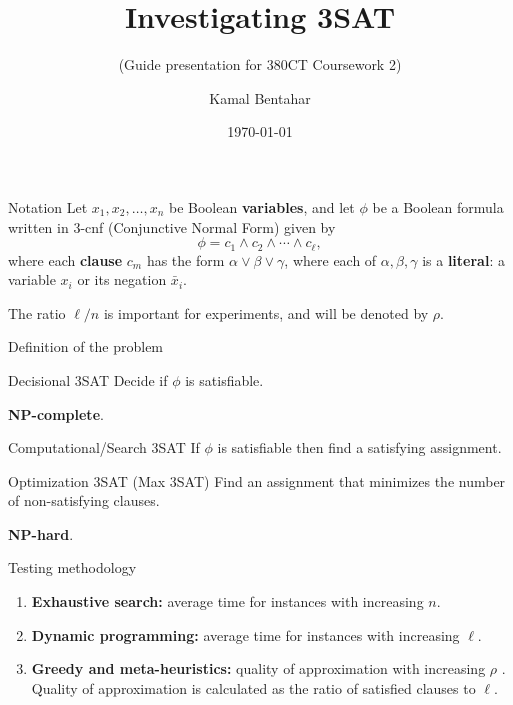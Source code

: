\documentclass[aspectratio=169, compress, xcolor=table,xcolor=dvipsnames]{beamer}
\author{Kamal Bentahar}
\title{Investigating 3SAT}
\subtitle{(Guide presentation for 380CT Coursework 2)}
\date{\today}
\newcommand{\cnpc}{\textbf{NP-complete}}
\newcommand{\cnph}{\textbf{NP-hard}}
\renewcommand{\lnot}{\bar}
\begin{document}
\begin{frame}[noframenumbering]
	\titlepage
\end{frame}
	
\begin{frame}{Notation}
	Let $x_1,x_2,\ldots,x_n$ be Boolean \textbf{variables}, and let $\phi$ be a Boolean formula written in 3-cnf (Conjunctive Normal Form) given by
	\[
	\phi = c_1\land c_2\land \cdots \land c_\ell,
	\]
where each \textbf{clause} $c_m$ has the form $\alpha\lor \beta \lor \gamma$, where each of $\alpha, \beta, \gamma$ is a \textbf{literal}: a variable $x_i$ or its negation $\lnot x_i$.

\vfill
The ratio $\ell/n$ is important for experiments, and will be denoted by $\rho$.
\end{frame}

\begin{frame}{Definition of the problem}


	\begin{block}{Decisional 3SAT}
		Decide if $\phi$ is satisfiable.
	\end{block}
	\cnpc.

	\begin{block}{Computational/Search 3SAT}
		If $\phi$ is satisfiable then find a satisfying assignment.
	\end{block}

	\begin{block}{Optimization 3SAT (Max 3SAT)}
		Find an assignment that minimizes the number of non-satisfying clauses.
	\end{block}
	\cnph.
\end{frame}

\begin{frame}
{Testing methodology}

\begin{enumerate}
	\item \textbf{Exhaustive search:} average time for instances with increasing $n$.
	\item \textbf{Dynamic programming:} average time for instances with increasing $\ell$.
	\item \textbf{Greedy and meta-heuristics:} quality of approximation with increasing $\rho$ . Quality of approximation is calculated as the ratio of satisfied clauses to $\ell$.
\end{enumerate}
\end{frame}
\end{document}
